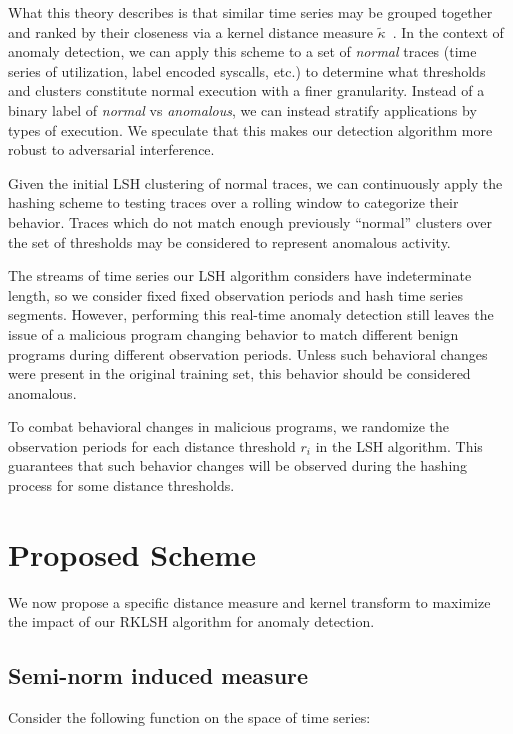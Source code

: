 \documentclass[a4paper]{article}
\theoremstyle{def}
\theoremstyle{thm}
\begin{document}
What this theory describes is that similar time series may be grouped together and ranked by their closeness via a kernel distance measure $\tilde{\kappa}$~\cite{Hachiya13-NSH}.
In the context of anomaly detection, we can apply this scheme to a set of \textit{normal} traces (time series of utilization, label encoded syscalls, etc.) to determine what thresholds and clusters constitute normal execution with a finer granularity.
Instead of a binary label of \textit{normal} vs \textit{anomalous}, we can instead stratify applications by types of execution.
We speculate that this makes our detection algorithm more robust to adversarial interference.

Given the initial LSH clustering of normal traces, we can continuously apply the hashing scheme to testing traces over a rolling window to categorize their behavior.
Traces which do not match enough previously ``normal'' clusters over the set of thresholds may be considered to represent anomalous activity.

The streams of time series our LSH algorithm considers have indeterminate length, so we consider fixed fixed observation periods and hash time series segments.
However, performing this real-time anomaly detection still leaves the issue of a malicious program changing behavior to match different benign programs during different observation periods.
Unless such behavioral changes were present in the original training set, this behavior should be considered anomalous.

To combat behavioral changes in malicious programs, we randomize the observation periods for each distance threshold $r_i$ in the LSH algorithm.
This guarantees that such behavior changes will be observed during the hashing process for some distance thresholds.

\section{Proposed Scheme}
\label{sec:proposed_scheme}

We now propose a specific distance measure and kernel transform to maximize the impact of our RKLSH algorithm for anomaly detection.

\subsection{Semi-norm induced measure}

Consider the following function on the space of time series:
\end{document}
